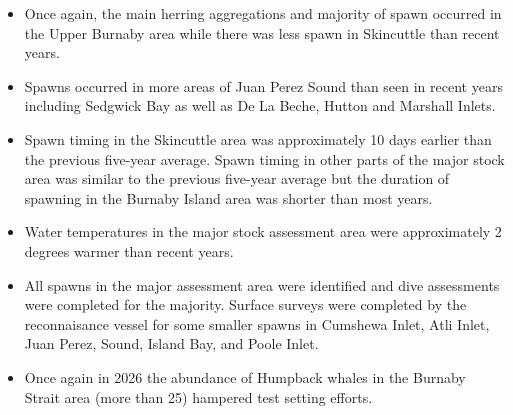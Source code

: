 \begin{itemize}

\item Once again, the main herring aggregations and majority of spawn
occurred in the Upper Burnaby area
while there was less spawn in Skincuttle than recent years.

\item Spawns occurred in more areas of Juan Perez Sound than seen in recent years
including Sedgwick Bay as well as De La Beche, Hutton and Marshall Inlets.

\item Spawn timing in the Skincuttle area was approximately 10 days earlier
than the previous five-year average.
Spawn timing in other parts of the major stock area was similar
to the previous five-year average but
the duration of spawning in the Burnaby Island area was shorter than most years.

\item Water temperatures in the major stock assessment area were
approximately 2 degrees warmer than recent years.

\item All spawns in the major assessment area were identified and
dive assessments were completed for the majority.
Surface surveys were completed by
the reconnaisance vessel for some smaller spawns in
Cumshewa Inlet, Atli Inlet, Juan Perez, Sound,
Island Bay, and Poole Inlet.

\item Once again in 2026 the abundance of Humpback whales in
the Burnaby Strait area (more than 25) hampered test setting efforts.

\end{itemize}